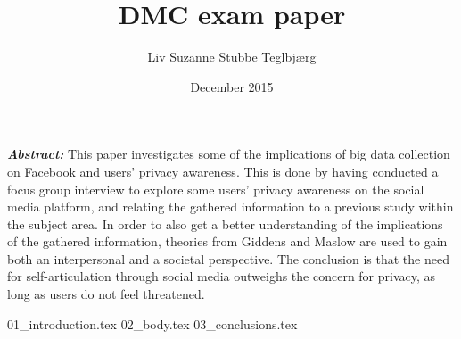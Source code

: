 \documentclass[12pt, a4paper]{report}
\title{DMC exam paper}
\author{Liv Suzanne Stubbe Teglbjærg}
\date{December 2015}
\begin{document}


\textbf{\textit{Abstract:}} This paper investigates some of the implications of big data collection on Facebook and users’ privacy awareness. This is done by having conducted a focus group interview to explore some users’ privacy awareness on the social media platform, and relating the gathered information to a previous study within the subject area. In order to also get a better understanding of the implications of the gathered information, theories from Giddens and Maslow are used to gain both an interpersonal and a societal perspective. The conclusion is that the need for self-articulation through social media outweighs the concern for privacy, as long as users do not feel threatened.

\tableofcontents

{01_introduction.tex}
{02_body.tex}
{03_conclusions.tex}

\printbibliography[heading=bibintoc, title={Reference List}]

\appendix
\end{document}
